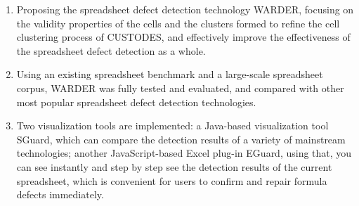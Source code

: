 \begin{englishabstract}
\begin{enumerate}
    \item Proposing the spreadsheet defect detection technology WARDER, focusing on the validity properties of the cells and the clusters formed to refine the cell clustering process of CUSTODES, and effectively improve the effectiveness of the spreadsheet defect detection as a whole.
    \item Using an existing spreadsheet benchmark and a large-scale spreadsheet corpus, WARDER was fully tested and evaluated, and compared with other most popular spreadsheet defect detection technologies. 
    \item Two visualization tools are implemented: a Java-based visualization tool SGuard, which can compare the detection results of a variety of mainstream technologies; another JavaScript-based Excel plug-in EGuard, using that, you can see instantly and step by step see the detection results of the current spreadsheet, which is convenient for users to confirm and repair formula defects immediately.
\end{enumerate}


\end{englishabstract}